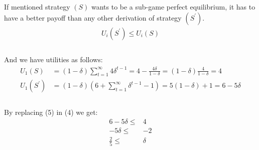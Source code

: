 \documentclass[
  course = {{IE579 Game Theory and Multi-Agent Reinforcement Learning}},
  quartile = {{4}},
  assignment = 2,
  name = {{Mohammad Mahdi Rahimi}},
  studentnumber = {{20208244}},
  email = {{mahi@kaist.ac.kr}},
  firstexercise = 1
]{aga-homework}
\begin{document}
\exercise
\subexercise 
\\\\
If mentioned strategy $(S)$ wants to be a sub-game perfect equilibrium, it has to have a better payoff than any other derivation of strategy $(S^\prime)$. 
\begin{equation} \label{eq1}
\begin{split}
U_i(S^\prime) \le U_i(S) \\
\end{split}
\end{equation}\\
And we have utilities as follows:\\
\begin{equation} \label{eq1}
\begin{split}
U_1(S) & = (1 - \delta)\sum^\infty_{t = 1}{4\delta^{t - 1}} = 4 - \frac{4\delta}{1 - \delta} = (1 - \delta)\frac{4}{1 - \delta} = 4\\
U_1(S^\prime) & = (1 - \delta)(6 + \sum^\infty_{t = 1}{\delta^{t - 1}} - 1) = 5(1 - \delta) + 1 = 6 - 5\delta\\
\end{split}
\end{equation}\\
By replacing (5) in (4) we get:
\begin{equation} \label{eq1}
\begin{split}
6 - 5\delta \le & 4\\
-5\delta \le & -2\\
\frac{2}{5} \le & \delta
\end{split}
\end{equation}\\
\end{document}
